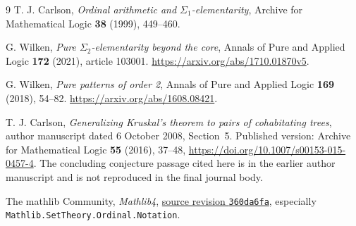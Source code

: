 \documentclass[11pt]{article}
\begin{document}
\begin{thebibliography}{9}
T. J. Carlson, \emph{Ordinal arithmetic and $\Sigma_1$-elementarity},
Archive for Mathematical Logic \textbf{38} (1999), 449--460.

G. Wilken, \emph{Pure $\Sigma_2$-elementarity beyond the core},
Annals of Pure and Applied Logic \textbf{172} (2021), article 103001.
\url{https://arxiv.org/abs/1710.01870v5}.

G. Wilken, \emph{Pure patterns of order 2},
Annals of Pure and Applied Logic \textbf{169} (2018), 54--82.
\url{https://arxiv.org/abs/1608.08421}.

T. J. Carlson, \emph{Generalizing Kruskal's theorem to pairs of
cohabitating trees}, author manuscript dated 6 October 2008, Section~5.
Published version: Archive for Mathematical Logic \textbf{55} (2016),
37--48, \url{https://doi.org/10.1007/s00153-015-0457-4}.
The concluding conjecture passage cited here is in the earlier author
manuscript and is not reproduced in the final journal body.

The mathlib Community, \emph{Mathlib4},
\href{https://github.com/leanprover-community/mathlib4/tree/360da6fa66c1273b76b6b2d8c5666fd5ac2e3b56}{source revision \texttt{360da6fa}},
especially \texttt{Mathlib.SetTheory.Ordinal.Notation}.
\end{thebibliography}
\end{document}
